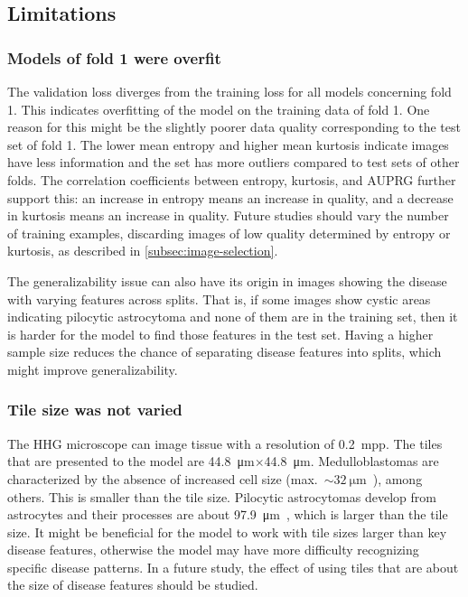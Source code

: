 \subsection{Limitations}
\subsubsection{Models of fold 1 were overfit}
The validation loss diverges from the training loss for all models concerning fold 1.
This indicates overfitting of the model on the training data of fold 1.
One reason for this might be the slightly poorer data quality corresponding to the test set of fold 1.
The lower mean entropy and higher mean kurtosis indicate images have less information and the set has more outliers compared to test sets of other folds.
The correlation coefficients between entropy, kurtosis, and AUPRG further support this: an increase in entropy means an increase in quality, and a decrease in kurtosis means an increase in quality.
Future studies should vary the number of training examples, discarding images of low quality determined by entropy or kurtosis, as described in \ref{subsec:image-selection}.

The generalizability issue can also have its origin in images showing the disease with varying features across splits.
That is, if some images show \eg cystic areas indicating pilocytic astrocytoma and none of them are in the training set, then it is harder for the model to find those features in the test set.
Having a higher sample size reduces the chance of separating disease features into splits, which might improve generalizability.

\subsubsection{Tile size was not varied}
The HHG microscope can image tissue with a resolution of \qty{0.2}{mpp}.
The tiles that are presented to the model are \qty{44.8}{\micro\meter}$\times$\qty{44.8}{\micro\meter}.
Medulloblastomas are characterized by the absence of increased cell size (max.~$\sim\qty{32}{\micro\meter}$~), among others.
This is smaller than the tile size.
Pilocytic astrocytomas develop from astrocytes and their processes are about \qty{97.9}{\micro\meter}~, which is larger than the tile size.
It might be beneficial for the model to work with tile sizes larger than key disease features, otherwise the model may have more difficulty recognizing specific disease patterns.
In a future study, the effect of using tiles that are about the size of disease features should be studied.

